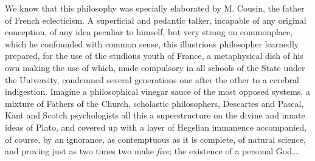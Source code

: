 \documentclass[12pt]{report}
\begin{document}
We know that this philosophy was specially elaborated by M. Cousin, the father of French eclecticism. A superficial and pedantic talker, incapable of any original conception, of any idea peculiar to himself, but very strong on commonplace, which he confounded with common sense, this illustrious philosopher learnedly prepared, for the use of the studious youth of France, a metaphysical dish of his own making the use of which, made compulsory in all schools of the State under the University, condemned several generations one after the other to a cerebral indigestion. Imagine a philosophical vinegar sauce of the most opposed systems, a mixture of Fathers of the Church, scholastic philosophers, Descartes and Pascal, Kant and Scotch psychologists all this a superstructure on the divine and innate ideas of Plato, and covered up with a layer of Hegelian immanence accompanied, of course, by an ignorance, as contemptuous as it is complete, of natural science, and proving just as two times two make \emph{five}; the existence of a personal God\dots{}.
\end{document}
